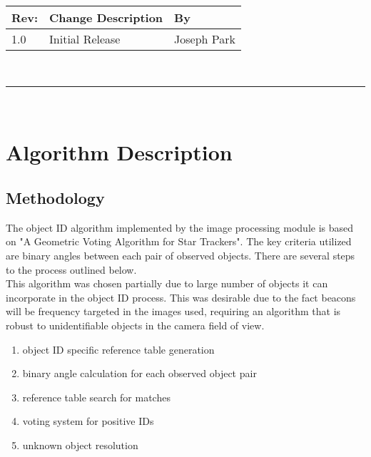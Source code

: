 \documentclass[]{DINOReportMemo}
\begin{document}
\makeCover


%
%
\pagestyle{empty}
{\renewcommand{\arraystretch}{2}
\noindent

\begin{longtable}{|p{0.5in}|p{4.5in}|p{1.14in}|}
\hline
{\bfseries Rev}: & {\bfseries Change Description} & {\bfseries By} \\
\hline
1.0 & Initial Release &  Joseph Park\\ %
\hline
\end{longtable}
}
\addtocounter{table}{-1}

\newpage
\setcounter{page}{1}
\pagestyle{fancy}

\tableofcontents
~\\ \hrule ~\\

\newpage
\section{Algorithm Description}
\subsection{Methodology} The object ID algorithm implemented by the image processing module is based on "A Geometric Voting Algorithm for Star Trackers". The key criteria utilized are binary angles between each pair of observed objects. There are several steps to the process outlined below. \\
\noindent This algorithm was chosen partially due to large number of objects it can incorporate in the object ID process. This was desirable due to the fact beacons will be frequency targeted in the images used, requiring an algorithm that is robust to unidentifiable objects in the camera field of view. \\ 
\begin{enumerate}
  \item object ID specific reference table generation
  \item binary angle calculation for each observed object pair
  \item reference table search for matches
  \item voting system for positive IDs
  \item unknown object resolution
  \\
\end{enumerate}
\end{document}
